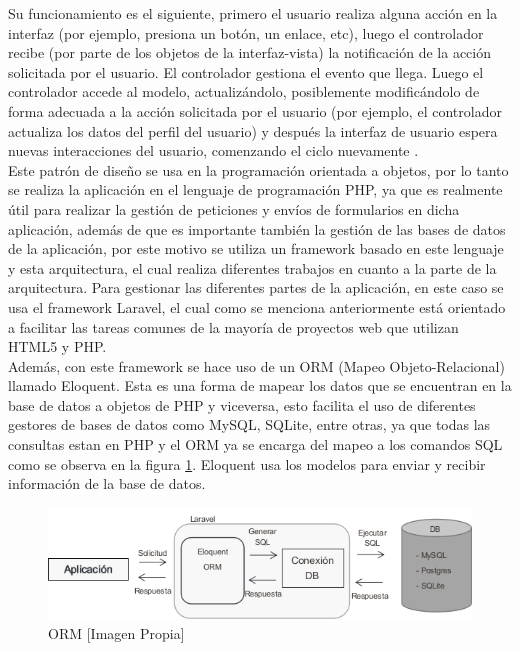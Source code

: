 Su funcionamiento es el siguiente, primero el usuario realiza alguna acción en la interfaz (por ejemplo, presiona un botón, un enlace, etc), luego el controlador recibe (por parte de los objetos de la interfaz-vista) la notificación de la acción solicitada por el usuario. El controlador gestiona el evento que llega. Luego el controlador accede al modelo, actualizándolo, posiblemente modificándolo de forma adecuada a la acción solicitada por el usuario (por ejemplo, el controlador actualiza los datos del perfil del usuario) y después la interfaz de usuario espera nuevas interacciones del usuario, comenzando el ciclo nuevamente \cite{MVC2}.\\

Este patrón de diseño se usa en la programación orientada a objetos, por lo tanto se realiza la aplicación en el lenguaje de programación PHP, ya que es realmente útil para realizar la gestión de peticiones y envíos de formularios en dicha aplicación, además de que es importante también la gestión de las bases de datos de la aplicación, por este motivo se utiliza un framework basado en este lenguaje y esta arquitectura, el cual realiza diferentes trabajos en cuanto a la parte de la arquitectura. Para gestionar las diferentes partes de la aplicación, en este caso se usa el framework Laravel, el cual como se menciona anteriormente está orientado a facilitar las tareas comunes de la mayoría de proyectos web que utilizan HTML5 y PHP.\\

Además, con este framework se hace uso de un ORM (Mapeo Objeto-Relacional) llamado Eloquent. Esta es una forma de mapear los datos que se encuentran en la base de datos a objetos de PHP y viceversa, esto facilita el uso de diferentes gestores de bases de datos como MySQL, SQLite, entre otras, ya que todas las consultas estan en PHP y el ORM ya se encarga del mapeo a los comandos SQL como se observa en la figura \ref{fig:orm}. Eloquent usa los modelos para enviar y recibir información de la base de datos\cite{Eloq}.\\

\begin{figure}[H]
	\centering
	\caption[ORM]{ORM [Imagen Propia]}
	\label{fig:orm}
	\includegraphics[width=0.7\linewidth]{Imagenes/ORM}
\end{figure}

